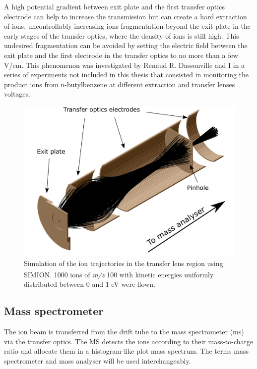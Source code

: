 A high potential gradient between exit plate and the first transfer optics electrode can help to increase the transmission but can create a hard extraction of ions, %
 uncontrollably increasing ions fragmentation beyond the exit plate in the early stages of the transfer optics, where the density of ions is still high. This undesired fragmentation can be avoided by setting  the electric field between the exit plate and the first electrode in the transfer optics to no more than a few V/cm. 
 This phenomenon was investigated by Renaud R. Dassonville and I in a series of experiments not included in this thesis that consisted in monitoring the product ions from n-butylbenzene at different extraction and transfer lenses voltages.
 

\begin{figure}%
\centering
\includegraphics[width=0.6\linewidth]{pics/tf_names.png}
\centering
\caption[Simulation of the ion trajectories in the transfer lens region using SIMION\textsuperscript{\textregistered}.]{Simulation of the ion trajectories in the transfer lens region using SIMION\textsuperscript{\textregistered}. 1000 ions of \textit{m/z} 100 with kinetic energies uniformly distributed between 0 and 1 eV were flown.}
\label{fig:tl_simion}
\end{figure}


\subsection{Mass spectrometer}
The ion beam is transferred from the drift tube to the mass spectrometer (\acrshort{ms}) via the transfer optics. The MS detects the ions according to their mass-to-charge ratio and allocate them in a histogram-like plot mass spectrum.  The terms mass spectrometer and mass analyser will be used interchangeably.

